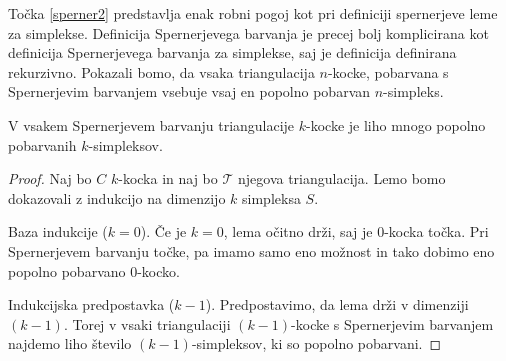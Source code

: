 \documentclass[mat1]{fmfdelo}
\newcommand{\0}{\underline{0}}
\newcommand{\pT}{\mathcal T}
\begin{document}
Točka \eqref{sperner2} predstavlja enak robni pogoj kot pri definiciji spernerjeve leme za simplekse.
Definicija Spernerjevega barvanja je precej bolj komplicirana kot definicija Spernerjevega barvanja za simplekse, saj je definicija \label{def:cubsperner} definirana rekurzivno.
Pokazali bomo, da vsaka triangulacija $n$-kocke, pobarvana s Spernerjevim barvanjem vsebuje vsaj en popolno pobarvan $n$-simpleks.
\begin{lema}\label{izr:kubsperner}
V vsakem Spernerjevem barvanju triangulacije $k$-kocke je liho mnogo popolno pobarvanih $k$-simpleksov.
\end{lema}
\begin{proof}
Naj bo $C$ $k$-kocka in naj bo $\pT$ njegova triangulacija. Lemo bomo dokazovali z indukcijo na dimenzijo $k$ simpleksa $S$.

Baza indukcije ($k = 0$).
Če je $k = 0$, lema očitno drži, saj je $0$-kocka točka. Pri Spernerjevem barvanju točke, pa imamo samo eno možnost in tako dobimo eno popolno pobarvano $0$-kocko.

Indukcijska predpostavka ($k - 1$).
Predpostavimo, da lema drži v dimenziji $(k - 1)$. Torej v vsaki triangulaciji $(k - 1)$-kocke s Spernerjevim barvanjem najdemo liho število $(k - 1)$-simpleksov, ki so popolno pobarvani.


\end{proof}
\end{document}
